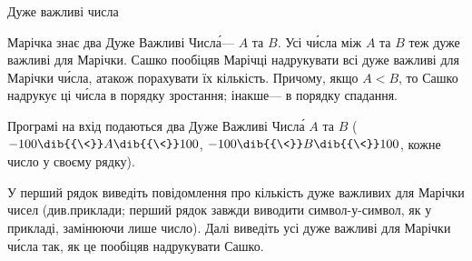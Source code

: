 {

\begin{problemAllDefault}{Дуже важливі числа}

Марічка знає два Дуже Важливі Числ\'{а}\nolinebreak[3] --- $A$ та $B$. Усі ч\'{и}сла між $A$ та $B$ теж дуже важливі для Марічки. 
Сашко пообіцяв Марічці надрукувати всі дуже важливі для Марічки ч\'{и}сла, а\nolinebreak[3] також порахувати їх кількість. 
Причому, якщо ${A < B}$, то Сашко надрукує ці ч\'{и}сла в порядку зростання; інакше\nolinebreak[3] --- в порядку спадання.


\InputFile
Програмі на вхід подаються два Дуже Важливі Числ\'{а} $A$ та $B$ 
($-100\dib{{\<}}A\dib{{\<}}100$, $-100\dib{{\<}}B\dib{{\<}}100$, кожне число у своєму рядку).

\OutputFile
У перший рядок виведіть повідомлення про кількість дуже важливих для Марічки чисел (див.\nolinebreak[2] приклади; перший рядок завжди виводити символ-у-символ, як у прикладі, замінюючи лише число). 
Далі виведіть усі дуже важливі для Марічки ч\'{и}сла так, як це пообіцяв надрукувати Сашко.

\end{problemAllDefault}

}